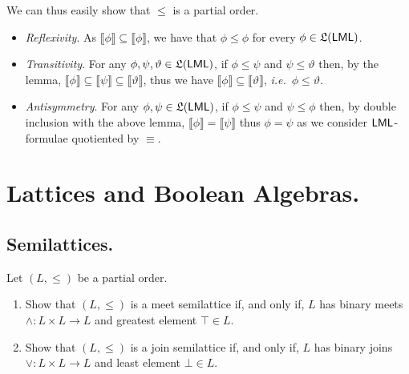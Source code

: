 \documentclass[fontsize=16pt,a4paper,DIV=17,parskip=half]{scrartcl}
\renewcommand{\mathsf}[1]{\textup{\textsf{#1}}}
\theoremstyle{definition}
\begin{document}
  We can thus easily show that $\le$ is a partial order.
  \begin{itemize}
    \item \textit{Reflexivity}. As $\llbracket \phi\rrbracket \subseteq \llbracket \phi\rrbracket$, we have that $\phi \le \phi$ for every $\phi \in \mathfrak L(\mathsf{LML})$.
    \item \textit{Transitivity}. For any $\phi, \psi, \vartheta \in \mathfrak L(\mathsf{LML})$, if $\phi \le \psi$ and $\psi \le \vartheta$ then, by the lemma, $\llbracket \phi\rrbracket \subseteq \llbracket \psi\rrbracket \subseteq \llbracket \vartheta\rrbracket$, thus we have $\llbracket \phi \rrbracket \subseteq \llbracket \vartheta\rrbracket$, \textit{i.e.}\ $\phi \le \vartheta$.
    \item \textit{Antisymmetry}.
      For any $\phi, \psi \in \mathfrak L(\mathsf{LML})$, if $\phi \le \psi$ and $\psi \le \phi$ then, by double inclusion with the above lemma, $\llbracket \phi\rrbracket = \llbracket \psi\rrbracket$ thus $\phi = \psi$ as we consider $\mathsf{LML}$-formulae quotiented by $\equiv$.
  \end{itemize}

  \section{Lattices and Boolean Algebras.}

  \subsection{Semilattices.}

  \begin{que}
    \label{q3}
    Let $(L, \le)$ be a partial order.
    \begin{enumerate}
      \item Show that $(L, \le)$ is a meet semilattice if, and only if, $L$ has binary meets $\wedge : {L \times L} \to L$ and greatest element $\top \in L$.
        \label{q3-1}
      \item Show that $(L, \le)$ is a join semilattice if, and only if, $L$ has binary joins $\vee : {L \times L} \to L$ and least element $\bot \in L$.
    \end{enumerate}
  \end{que}
\end{document}
